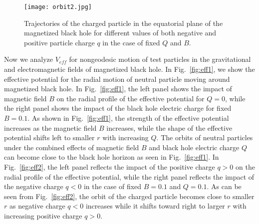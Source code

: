 \documentclass[showpacs,twocolumn,superscriptaddress]{revtex4}
\begin{document}
%
\begin{figure*}
\centering
\texttt{[image: orbit2.jpg]}%

\caption{\label{fig:traj3} Trajectories of the charged particle in the equatorial plane of the magnetized black hole for different values of both negative and positive particle charge $q$ in the case of fixed $Q$ and $B$. %
} 
\end{figure*}

 Now we analyze $V_{eff}$ for nongeodesic motion of test particles in the gravitational and electromagnetic fields of magnetized black hole. In Fig.~\ref{fig:eff1}, we show the effective potential for the radial motion of neutral particle moving around magnetized black hole. In Fig.~\ref{fig:eff1}, the left panel shows the impact of magnetic field $B$ on the radial profile of the effective potential for $Q=0$, while the right panel shows the impact of the black hole electric charge for fixed $B=0.1$. As shown in Fig.~\ref{fig:eff1}, the strength of the effective potential increases as the magnetic field $B$ increases, while the shape of the effective potential shifts left to smaller $r$ with increasing $Q$. The orbits of neutral particles under the combined effects of magnetic field $B$ and black hole electric charge $Q$ can become close to the black hole horizon as seen in Fig.~\ref{fig:eff1}. In Fig.~\ref{fig:eff2},  the left panel reflects the impact of the positive charge $q>0$ on the radial profile of the effective potential, while the right panel reflects the impact of the negative charge $q<0$ in the case of fixed $B=0.1$ and $Q=0.1$. As can be seen from Fig.~\ref{fig:eff2}, the orbit of the charged particle becomes close to smaller $r$ as negative charge $q<0$ increases while it shifts toward right to larger $r$ with increasing positive charge $q>0$. 
\end{document}
